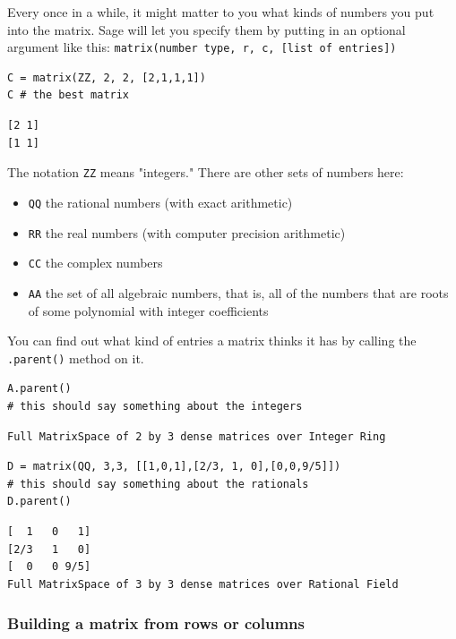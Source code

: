 \documentclass[10pt,]{book}
\theoremstyle{plain}
\theoremstyle{definition}
\numberwithin{equation}{section}
\begin{document}
        Every once in a while, it might matter to you what kinds of numbers you
        put into the matrix. Sage will let you specify them by putting in an optional
        argument like this: \verb?matrix(number type, r, c, [list of entries])?
\begin{lstlisting}[style=sageinput]
C = matrix(ZZ, 2, 2, [2,1,1,1])
C # the best matrix
\end{lstlisting}
\begin{lstlisting}[style=sageoutput]
[2 1]
[1 1]
\end{lstlisting}
\par

        The notation \verb?ZZ? means "integers." There are other sets of numbers
        here:
        \begin{itemize}
\item{}\verb?QQ? the rational numbers (with exact arithmetic)\item{}\verb?RR? the real numbers (with computer precision arithmetic)\item{}\verb?CC? the complex numbers\item{}\verb?AA? the set of all algebraic numbers, that is, all of the
            numbers that are roots of some polynomial with integer coefficients
          \end{itemize}

        You can find out what kind of entries a matrix thinks it has by calling the
        \verb?.parent()? method on it.
\begin{lstlisting}[style=sageinput]
A.parent()
# this should say something about the integers
\end{lstlisting}
\begin{lstlisting}[style=sageoutput]
Full MatrixSpace of 2 by 3 dense matrices over Integer Ring
\end{lstlisting}
\begin{lstlisting}[style=sageinput]
D = matrix(QQ, 3,3, [[1,0,1],[2/3, 1, 0],[0,0,9/5]])
# this should say something about the rationals
D.parent()
\end{lstlisting}
\begin{lstlisting}[style=sageoutput]
[  1   0   1]
[2/3   1   0]
[  0   0 9/5]
Full MatrixSpace of 3 by 3 dense matrices over Rational Field
\end{lstlisting}
\typeout{************************************************}
\typeout{************************************************}
\subsubsection[Building a matrix from rows or columns]{Building a matrix from rows or columns}\label{subsubsection-8}
\end{document}
